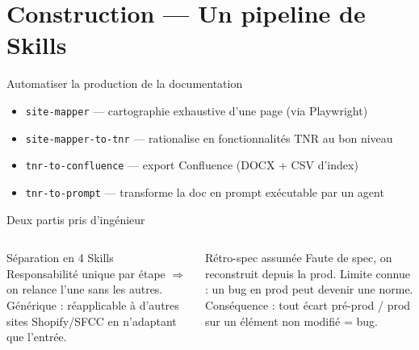 \section{Construction --- Un pipeline de Skills}

\begin{frame}{Automatiser la production de la documentation}
  \vskip 4pt
  \footnotesize
  \begin{itemize}
    \item \texttt{site-mapper} --- cartographie exhaustive d'une page (via Playwright)
    \item \texttt{site-mapper-to-tnr} --- rationalise en fonctionnalités TNR au bon niveau
    \item \texttt{tnr-to-confluence} --- export Confluence (DOCX + CSV d'index)
    \item \texttt{tnr-to-prompt} --- transforme la doc en prompt exécutable par un agent
  \end{itemize}
\end{frame}

\begin{frame}{Deux partis pris d'ingénieur}
  \begin{columns}[T]
    \begin{block}{Séparation en 4 Skills}
      \footnotesize
      Responsabilité unique par étape $\Rightarrow$ on \alert{relance l'une sans les autres}.
      Générique : réapplicable à d'autres sites Shopify/SFCC en n'adaptant que l'entrée.
    \end{block}
    \begin{alertblock}{Rétro-spec assumée}
      \footnotesize
      Faute de spec, on reconstruit depuis la prod.
      Limite connue : un bug en prod peut devenir une norme.
      Conséquence : tout écart pré-prod / prod sur un élément non modifié = bug.
    \end{alertblock}
  \end{columns}
  \vskip 6pt
\end{frame}
